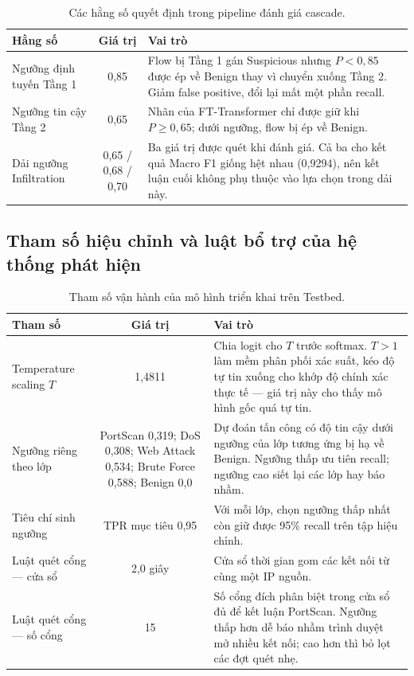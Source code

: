 \documentclass[../DoAn.tex]{subfiles}
\begin{document}
\begin{table}[H]
    \centering
    \caption{Các hằng số quyết định trong pipeline đánh giá cascade.}
    \label{tab:runtime-cascade}
    \begin{tabular}{lcp{7.2cm}}
        \hline
        \textbf{Hằng số} & \textbf{Giá trị} & \textbf{Vai trò} \\
        \hline
        Ngưỡng định tuyến Tầng 1 & 0,85 & Flow bị Tầng 1 gán Suspicious nhưng $P < 0{,}85$ được ép về Benign thay vì chuyển xuống Tầng 2. Giảm false positive, đổi lại mất một phần recall. \\
        Ngưỡng tin cậy Tầng 2 & 0,65 & Nhãn của FT-Transformer chỉ được giữ khi $P \geq 0{,}65$; dưới ngưỡng, flow bị ép về Benign. \\
        Dải ngưỡng Infiltration & 0,65 / 0,68 / 0,70 & Ba giá trị được quét khi đánh giá. Cả ba cho kết quả Macro F1 giống hệt nhau (0,9294), nên kết luận cuối không phụ thuộc vào lựa chọn trong dải này. \\
        \hline
    \end{tabular}
\end{table}

\subsection{Tham số hiệu chỉnh và luật bổ trợ của hệ thống phát hiện}

\begin{table}[H]
    \centering
    \caption{Tham số vận hành của mô hình triển khai trên Testbed.}
    \label{tab:runtime-live}
    \begin{tabular}{lcp{6.6cm}}
        \hline
        \textbf{Tham số} & \textbf{Giá trị} & \textbf{Vai trò} \\
        \hline
        Temperature scaling $T$ & 1,4811 & Chia logit cho $T$ trước softmax. $T > 1$ làm mềm phân phối xác suất, kéo độ tự tin xuống cho khớp độ chính xác thực tế --- giá trị này cho thấy mô hình gốc quá tự tin. \\
        Ngưỡng riêng theo lớp & PortScan 0,319; DoS 0,308; Web Attack 0,534; Brute Force 0,588; Benign 0,0 & Dự đoán tấn công có độ tin cậy dưới ngưỡng của lớp tương ứng bị hạ về Benign. Ngưỡng thấp ưu tiên recall; ngưỡng cao siết lại các lớp hay báo nhầm. \\
        Tiêu chí sinh ngưỡng & TPR mục tiêu 0,95 & Với mỗi lớp, chọn ngưỡng thấp nhất còn giữ được 95\% recall trên tập hiệu chỉnh. \\
        Luật quét cổng --- cửa sổ & 2,0 giây & Cửa sổ thời gian gom các kết nối từ cùng một IP nguồn. \\
        Luật quét cổng --- số cổng & 15 & Số cổng đích phân biệt trong cửa sổ đủ để kết luận PortScan. Ngưỡng thấp hơn dễ báo nhầm trình duyệt mở nhiều kết nối; cao hơn thì bỏ lọt các đợt quét nhẹ. \\
        \hline
    \end{tabular}
\end{table}
\end{document}
